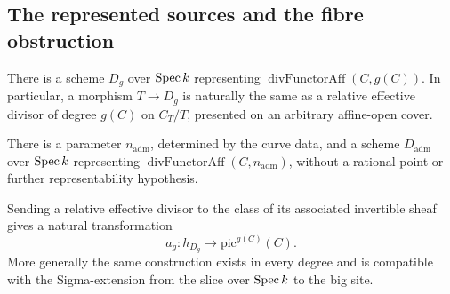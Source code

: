 \subsection{The represented sources and the fibre obstruction}

\begin{definition}
  \label{pa-def:genusDivisorRepresentation}
  \leanok

  There is a scheme \(D_g\) over \(\operatorname{Spec} k\) representing
  \(\operatorname{divFunctorAff}(C,g(C))\).  In particular, a morphism
  \(T\to D_g\) is naturally the same as a relative effective divisor of degree \(g(C)\) on
  \(C_T/T\), presented on an arbitrary affine-open cover.
\end{definition}

\begin{definition}
  \label{pa-def:admissibleDivisorRepresentation}
  \leanok

  There is a parameter \(n_{\mathrm{adm}}\), determined by the curve data, and a scheme
  \(D_{\mathrm{adm}}\) over \(\operatorname{Spec} k\) representing
  \(\operatorname{divFunctorAff}(C,n_{\mathrm{adm}})\), without a rational-point or further
  representability hypothesis.
\end{definition}

\begin{definition}
  \label{pa-def:genusAbelMap}
  \leanok

  Sending a relative effective divisor to the class of its associated invertible sheaf gives
  a natural transformation
  \[
    a_g \colon h_{D_g} \longrightarrow \mathrm{pic}^{g(C)}(C).
  \]
  More generally the same construction exists in every degree and is compatible with the
  Sigma-extension from the slice over \(\operatorname{Spec} k\) to the big site.
\end{definition}

